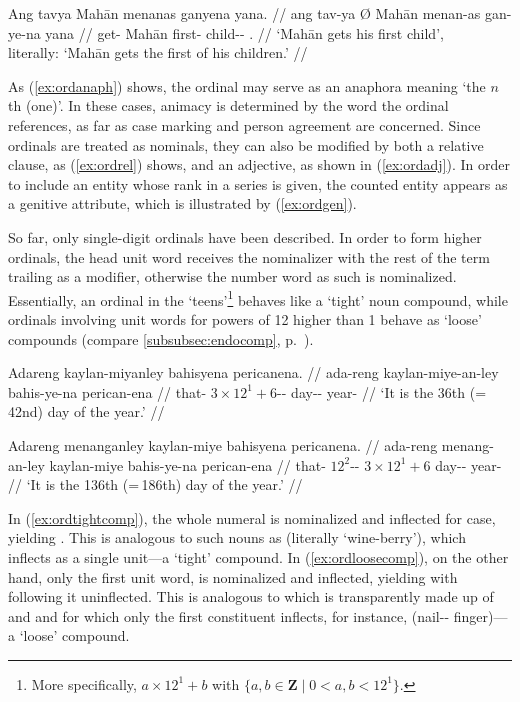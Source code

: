 \a\label{ex:ordgen}\begingl
	\gla Ang tavya {} Mahān menanas ganyena yana. //
	\glb ang tav-ya Ø Mahān menan-as gan-ye-na yana //
	\glc \AgtT{} get-\TsgM{} \Top{} Mahān first-\Parg{} child-\Pl{}-\Gen{} 
		\TsgM{}.\Gen{} //
	\glft `Mahān gets his first child', \\
		literally: `Mahān gets the first of his children.' //
\endgl

\xe

As (\ref{ex:ordanaph}) shows, the ordinal may serve as an anaphora meaning `the
$n$th (one)'. In these cases, animacy is determined by the word the ordinal
references, as far as case marking and person agreement are concerned. Since
ordinals are treated as nominals, they can also be modified by both a relative
clause, as (\ref{ex:ordrel}) shows, and an adjective, as shown in
(\ref{ex:ordadj}). In order to include an entity whose rank in a series is
given, the counted entity appears as a genitive attribute, which is illustrated
by (\ref{ex:ordgen}).

So far, only single-digit ordinals have been described. In order to form higher
ordinals, the head unit word receives the nominalizer with the rest of the term
trailing as a modifier, otherwise the number word as such is nominalized.
Essentially, an ordinal in the `teens'\footnote{More specifically, $a \times
12^1 + b$ with $\{a,b \in \textbf{Z} \mid 0 < a,b < 12^1\}$.} behaves like a
`tight' noun compound, while ordinals involving unit words for powers of 12
higher than 1 behave as `loose' compounds (compare
\autoref{subsubsec:endocomp}, p.~\pageref{loosecomp}). 

\pex
\a\label{ex:ordtightcomp}\begingl
	\gla Adareng kaylan-miyanley bahisyena pericanena. //
	\glb ada-reng kaylan-miye-an-ley bahis-ye-na perican-ena //
	\glc that-\AargI{} {$3 \times 12^1 + 6$-\Nmlz{}-\PargI{}} 
		day-\Pl{}-\Gen{} year-\Gen{} //
	\glft `It is the 36th (=\,42nd) day of the year.' //
\endgl

\a\label{ex:ordloosecomp}\begingl
	\gla Adareng menanganley kaylan-miye bahisyena pericanena. //
	\glb ada-reng menang-an-ley kaylan-miye bahis-ye-na perican-ena //
	\glc that-\AargI{} {$12^2$-\Nmlz{}-\PargI{}} {$3 \times 12^1 
		+ 6$} day-\Pl{}-\Gen{} year-\Gen{} //
	\glft `It is the 136th (=\,186th) day of the year.' //
\endgl

\xe

In (\ref{ex:ordtightcomp}), the whole numeral  is
nominalized and inflected for case, yielding
. This is analogous to such nouns as
 (literally `wine-berry'), which inflects
as a single unit---a `tight' compound. In (\ref{ex:ordloosecomp}), on the other
hand, only the first unit word,  is nominalized and
inflected, yielding  with
 following it uninflected. This is analogous to
 which is transparently made up of
 and  and for which only the
first constituent inflects, for instance,  (nail-\Pl{}-\Gen{} finger)---a `loose' compound.

